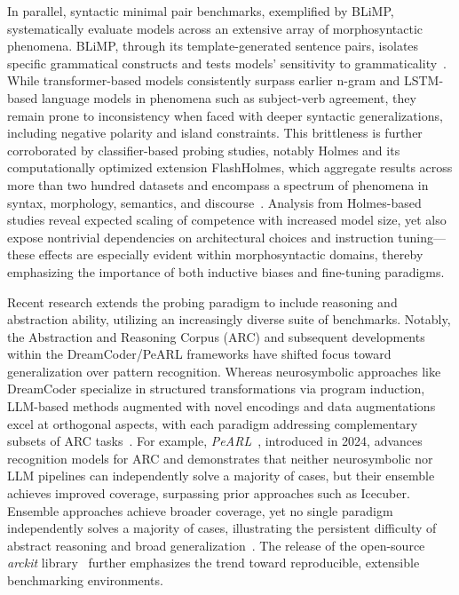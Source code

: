 \documentclass[sigconf]{acmart}
\begin{document}
In parallel, syntactic minimal pair benchmarks, exemplified by BLiMP, systematically evaluate models across an extensive array of morphosyntactic phenomena. BLiMP, through its template-generated sentence pairs, isolates specific grammatical constructs and tests models' sensitivity to grammaticality~\cite{ref97,ref99}. While transformer-based models consistently surpass earlier n-gram and LSTM-based language models in phenomena such as subject-verb agreement, they remain prone to inconsistency when faced with deeper syntactic generalizations, including negative polarity and island constraints. This brittleness is further corroborated by classifier-based probing studies, notably Holmes and its computationally optimized extension FlashHolmes, which aggregate results across more than two hundred datasets and encompass a spectrum of phenomena in syntax, morphology, semantics, and discourse~\cite{ref97,ref105}. Analysis from Holmes-based studies reveal expected scaling of competence with increased model size, yet also expose nontrivial dependencies on architectural choices and instruction tuning---these effects are especially evident within morphosyntactic domains, thereby emphasizing the importance of both inductive biases and fine-tuning paradigms.

Recent research extends the probing paradigm to include reasoning and abstraction ability, utilizing an increasingly diverse suite of benchmarks. Notably, the Abstraction and Reasoning Corpus (ARC) and subsequent developments within the DreamCoder/PeARL frameworks have shifted focus toward generalization over pattern recognition. Whereas neurosymbolic approaches like DreamCoder specialize in structured transformations via program induction, LLM-based methods augmented with novel encodings and data augmentations excel at orthogonal aspects, with each paradigm addressing complementary subsets of ARC tasks~\cite{ref91,ref92,ref95,ref105}. For example, \textit{PeARL}~\cite{ref92}, introduced in 2024, advances recognition models for ARC and demonstrates that neither neurosymbolic nor LLM pipelines can independently solve a majority of cases, but their ensemble achieves improved coverage, surpassing prior approaches such as Icecuber. Ensemble approaches achieve broader coverage, yet no single paradigm independently solves a majority of cases, illustrating the persistent difficulty of abstract reasoning and broad generalization~\cite{ref95,ref92,ref105}. The release of the open-source \textit{arckit} library~\cite{ref92} further emphasizes the trend toward reproducible, extensible benchmarking environments.
\end{document}
